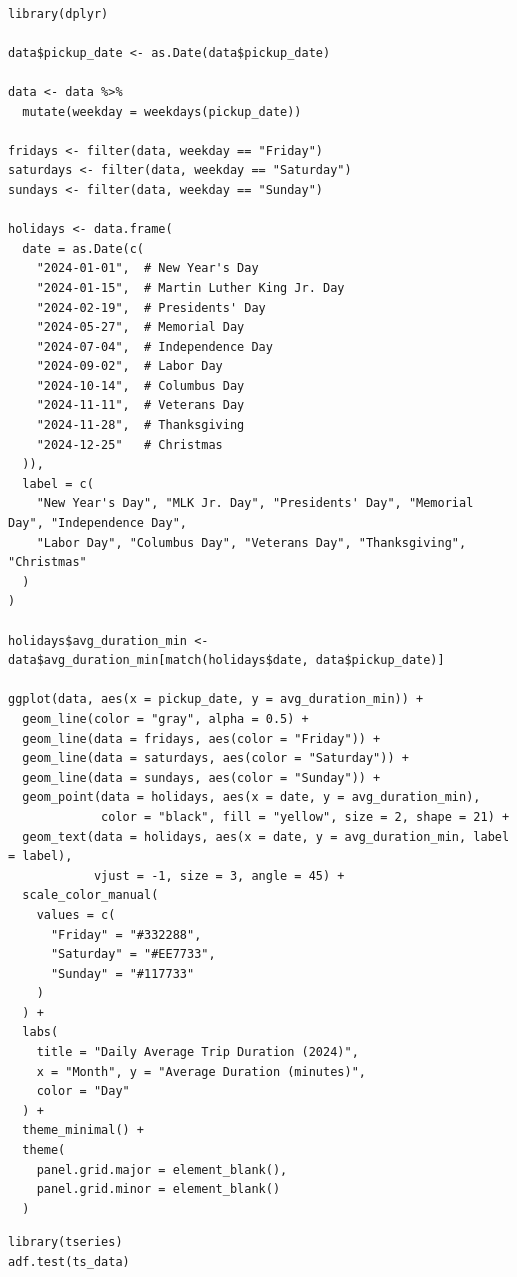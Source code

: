 \documentclass{article}
\begin{document}
\begin{lstlisting}[style=rstyle, caption={Plot Highlighting Weekends and Holidays}, label={lst:r_plot_weekend_holidays}]

library(dplyr)

data$pickup_date <- as.Date(data$pickup_date)

data <- data %>%
  mutate(weekday = weekdays(pickup_date))

fridays <- filter(data, weekday == "Friday")
saturdays <- filter(data, weekday == "Saturday")
sundays <- filter(data, weekday == "Sunday")

holidays <- data.frame(
  date = as.Date(c(
    "2024-01-01",  # New Year's Day
    "2024-01-15",  # Martin Luther King Jr. Day
    "2024-02-19",  # Presidents' Day
    "2024-05-27",  # Memorial Day
    "2024-07-04",  # Independence Day
    "2024-09-02",  # Labor Day
    "2024-10-14",  # Columbus Day
    "2024-11-11",  # Veterans Day
    "2024-11-28",  # Thanksgiving
    "2024-12-25"   # Christmas
  )),
  label = c(
    "New Year's Day", "MLK Jr. Day", "Presidents' Day", "Memorial Day", "Independence Day",
    "Labor Day", "Columbus Day", "Veterans Day", "Thanksgiving", "Christmas"
  )
)

holidays$avg_duration_min <- data$avg_duration_min[match(holidays$date, data$pickup_date)]

ggplot(data, aes(x = pickup_date, y = avg_duration_min)) +
  geom_line(color = "gray", alpha = 0.5) +
  geom_line(data = fridays, aes(color = "Friday")) +
  geom_line(data = saturdays, aes(color = "Saturday")) +
  geom_line(data = sundays, aes(color = "Sunday")) +
  geom_point(data = holidays, aes(x = date, y = avg_duration_min), 
             color = "black", fill = "yellow", size = 2, shape = 21) +
  geom_text(data = holidays, aes(x = date, y = avg_duration_min, label = label), 
            vjust = -1, size = 3, angle = 45) +
  scale_color_manual(
    values = c(
      "Friday" = "#332288", 
      "Saturday" = "#EE7733",
      "Sunday" = "#117733"   
    )
  ) +
  labs(
    title = "Daily Average Trip Duration (2024)",
    x = "Month", y = "Average Duration (minutes)",
    color = "Day"
  ) +
  theme_minimal() +
  theme(
    panel.grid.major = element_blank(),
    panel.grid.minor = element_blank()
  )

\end{lstlisting}

\begin{lstlisting}[style=rstyle, caption={ Augmented Dickey-Fuller (ADF) Test}, label={lst:r_adf_test}]
library(tseries)
adf.test(ts_data)
\end{lstlisting}
\end{document}
